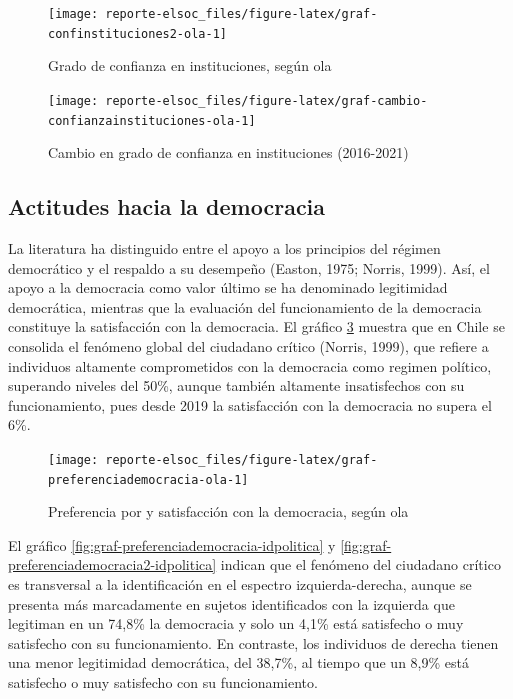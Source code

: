 \documentclass[
  12pt,
]{book}
\begin{document}
\begin{figure}

{\centering \texttt{[image: reporte-elsoc\_files/figure-latex/graf-confinstituciones2-ola-1]} 

}

\caption{Grado de confianza en instituciones, según ola}\label{fig:graf-confinstituciones2-ola}
\end{figure}

\begin{figure}

{\centering \texttt{[image: reporte-elsoc\_files/figure-latex/graf-cambio-confianzainstituciones-ola-1]} 

}

\caption{Cambio en grado de confianza en instituciones (2016-2021)}\label{fig:graf-cambio-confianzainstituciones-ola}
\end{figure}

\hypertarget{actitudes-hacia-la-democracia}{%
\subsection{Actitudes hacia la democracia}\label{actitudes-hacia-la-democracia}}

La literatura ha distinguido entre el apoyo a los principios del régimen democrático y el respaldo a su desempeño (Easton, 1975; Norris, 1999). Así, el apoyo a la democracia como valor último se ha denominado legitimidad democrática, mientras que la evaluación del funcionamiento de la democracia constituye la satisfacción con la democracia. El gráfico \ref{fig:graf-preferenciademocracia-ola} muestra que en Chile se consolida el fenómeno global del ciudadano crítico (Norris, 1999), que refiere a individuos altamente comprometidos con la democracia como regimen político, superando niveles del 50\%, aunque también altamente insatisfechos con su funcionamiento, pues desde 2019 la satisfacción con la democracia no supera el 6\%.

\begin{figure}

{\centering \texttt{[image: reporte-elsoc\_files/figure-latex/graf-preferenciademocracia-ola-1]} 

}

\caption{Preferencia por y satisfacción con la democracia, según ola}\label{fig:graf-preferenciademocracia-ola}
\end{figure}

El gráfico \ref{fig:graf-preferenciademocracia-idpolitica} y \ref{fig:graf-preferenciademocracia2-idpolitica} indican que el fenómeno del ciudadano crítico es transversal a la identificación en el espectro izquierda-derecha, aunque se presenta más marcadamente en sujetos identificados con la izquierda que legitiman en un 74,8\% la democracia y solo un 4,1\% está satisfecho o muy satisfecho con su funcionamiento. En contraste, los individuos de derecha tienen una menor legitimidad democrática, del 38,7\%, al tiempo que un 8,9\% está satisfecho o muy satisfecho con su funcionamiento.
\end{document}
